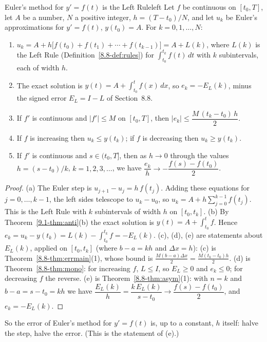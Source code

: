\documentclass[11pt]{article}
\begin{document}
\begin{thm}{Euler's method for $y'=f(t)$ is the Left Rule}{left}
Let $f$ be continuous on $[t_0,T]$, let $A$ be a number, $N$ a positive integer, $h=(T-t_0)/N$, and let $u_k$ be Euler's approximations for $y'=f(t)$, $y(t_0)=A$. For $k=0,1,\dots,N$:
\begin{enumerate}[label=(\alph*),nosep]
  \item $u_k=A+h\big[f(t_0)+f(t_1)+\cdots+f(t_{k-1})\big]=A+L(k)$, where $L(k)$ is the Left Rule (Definition~\ref{8.8-def:rules}) for $\int_{t_0}^{t_k}f(t)\,dt$ with $k$ subintervals, each of width $h$.
  \item The exact solution is $y(t)=A+\int_{t_0}^tf(x)\,dx$, so $e_k=-E_L(k)$, minus the signed error $E_L=I-L$ of Section~8.8.
  \item If $f'$ is continuous and $\lvert f'\rvert\le M$ on $[t_0,T]$, then $\lvert e_k\rvert\le\dfrac{M\,(t_k-t_0)\,h}{2}$.
  \item If $f$ is increasing then $u_k\le y(t_k)$; if $f$ is decreasing then $u_k\ge y(t_k)$.
  \item If $f'$ is continuous and $s\in(t_0,T]$, then as $h\to0$ through the values $h=(s-t_0)/k$, $k=1,2,3,\dots$, we have $\dfrac{e_k}{h}\to-\dfrac{f(s)-f(t_0)}2$.
\end{enumerate}
\end{thm}
\begin{proof}
(a) The Euler step is $u_{j+1}-u_j=h\,f(t_j)$. Adding these equations for $j=0,\dots,k-1$, the left sides telescope to $u_k-u_0$, so $u_k=A+h\sum_{j=0}^{k-1}f(t_j)$. This is the Left Rule with $k$ subintervals of width $h$ on $[t_0,t_k]$.
(b) By Theorem~\ref{9.1-thm:anti}(b) the exact solution is $y(t)=A+\int_{t_0}^tf$. Hence $e_k=u_k-y(t_k)=L(k)-\int_{t_0}^{t_k}f=-E_L(k)$.
(c), (d), (e) are statements about $E_L(k)$, applied on $[t_0,t_k]$ (where $b-a=kh$ and $\Delta x=h$): (c) is Theorem~\ref{8.8-thm:errmain}(1), whose bound is $\frac{M(b-a)\Delta x}{2}=\frac{M(t_k-t_0)h}{2}$. (d) is Theorem~\ref{8.8-thm:mono}: for increasing $f$, $L\le I$, so $E_L\ge0$ and $e_k\le0$; for decreasing $f$ the reverse. (e) is Theorem~\ref{8.8-thm:asym}(1): with $n=k$ and $b-a=s-t_0=kh$ we have $\dfrac{E_L(k)}h=\dfrac{k\,E_L(k)}{s-t_0}\to\dfrac{f(s)-f(t_0)}{2}$, and $e_k=-E_L(k)$.
\end{proof}

So the error of Euler's method for $y'=f(t)$ is, up to a constant, $h$ itself: halve the step, halve the error. (This is the statement of (e).)
\end{document}
